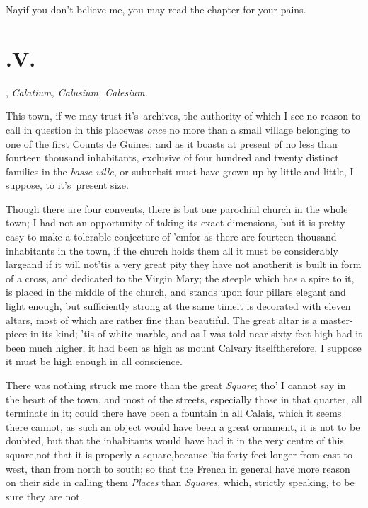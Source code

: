 \documentclass{article}
\begin{document}
\tsk Nay\tsk if you don’t believe me, you may read the
chapter for your pains.

\section{.\enspace V.}

, \textit{Calatium, Calusium,\break
Calesium.}

This town, if we may trust it's\sic\ ar\-chives, the authority of which
I see no reason to call in question in this place\tsk was
\textit{once} no more than a small village belonging to one of the
first Counts de Guines; and as it boasts at present of no
less than fourteen thousand inhabitants, exclusive of four hundred
and twenty distinct families in the \textit{basse ville}, or
suburbs\tsh it must have grown up by little and little, I
suppose, to it's\sic\ present size.

Though there are four convents, there is but one parochial church in the whole town;
I had not an opportunity of taking its exact dimensions, but it is pretty easy to
make a tolerable conjecture of ’em\tsk\break for as there are fourteen thousand
inhabitants in the town, if the church holds them all it must be considerably
large\tsk and if it will not\tsk ’tis a very great pity they have not another\tsk it
is built in form of a cross, and dedicated to the Virgin Mary; the steeple which
has a spire to it, is placed in the middle of the church, and stands upon four
pillars elegant and light enough, but sufficiently strong at the same time\tsk it is
decorated with eleven altars, most of which are rather fine than beautiful. The
great altar is a master-piece in its kind; ’tis of white marble, and as I was
told near sixty feet high\tsk{} had it been much higher, it had been as high as
mount Calvary itself\tsk therefore, I suppose it must be high enough in all
conscience.

There was nothing struck me more than the great \textit{Square};
tho’ I cannot say\break
{}\break in the heart of the town, and most of the streets,
especially those in that quarter, all terminate in it; could there
have been a fountain in all Calais, which it seems there
cannot, as such an object would have been a great ornament, it is
not to be doubted, but that the inhabitants would have had it in
the very centre of this square,\tsk not that it is properly a
square,\break\tsk because ’tis forty feet longer from
east to west, than from north to south; so that the French
in general have more reason on their side in calling them
\textit{Places} than \textit{Squares}, which, strictly speaking, to be
sure they are not.
\end{document}
